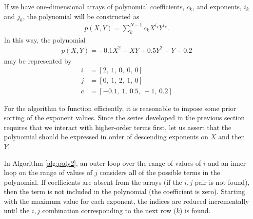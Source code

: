 If we have one-dimensional arrays of polynomial coefficients, $c_k$, and exponents, $i_k$ and $j_k$, the polynomial will be constructed as
\begin{align}
p(X,Y) = \sum_k^{N-1} c_k X^{i_k} Y^{i_k}.
\end{align}
In this way, the polynomial
\begin{align}
p(X,Y) = -0.1 X^2 + XY + 0.5 Y^2 - Y - 0.2
\end{align}
may be represented by
\begin{align}
i &= \left[ 2,\ 1,\ 0,\ 0,\ 0\right]\\
j &= \left[ 0,\ 1,\ 2,\ 1,\ 0\right]\\
c &= \left[ -0.1,\ 1,\ 0.5,\ -1,\ 0.2\right]
\end{align}

For the algorithm to function efficiently, it is reasonable to impose some prior sorting of the exponent values.  Since the series developed in the previous section requires that we interact with higher-order terms first, let us assert that the polynomial should be expressed in order of descending exponents on $X$ and then $Y$.

In Algorithm \ref{alg:poly2}, an outer loop over the range of values of $i$ and an inner loop on the range of values of $j$ considers all of the possible terms in the polynomial.  If coefficients are absent from the arrays (if the $i,j$ pair is not found), then the term is not included in the polynomial (the coefficient is zero).  Starting with the maximum value for each exponent, the indices are reduced incrementally until the $i,j$ combination corresponding to the next row ($k$) is found.


